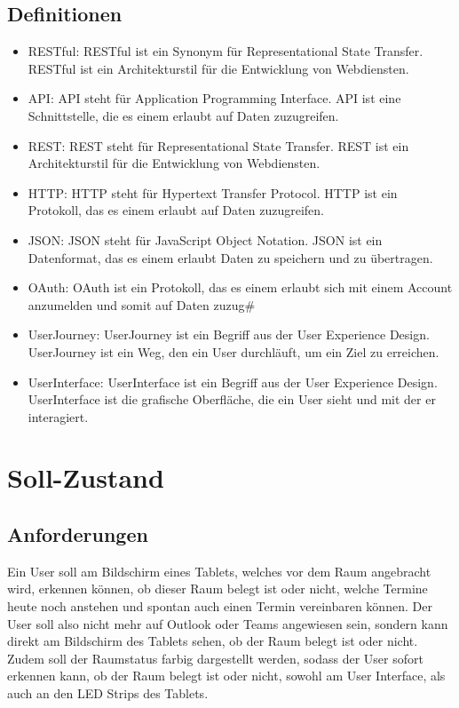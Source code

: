 \subsection{Definitionen}
\begin{itemize}
    \item \gls{RESTful}: RESTful ist ein Synonym für Representational State Transfer. RESTful ist ein Architekturstil für die Entwicklung von Webdiensten.
    \item \gls{API}: API steht für Application Programming Interface. API ist eine Schnittstelle, die es einem erlaubt auf Daten zuzugreifen.
    \item \gls{REST}: REST steht für Representational State Transfer. REST ist ein Architekturstil für die Entwicklung von Webdiensten.
    \item \gls{HTTP}: HTTP steht für Hypertext Transfer Protocol. HTTP ist ein Protokoll, das es einem erlaubt auf Daten zuzugreifen.
    \item \gls{JSON}: JSON steht für JavaScript Object Notation. JSON ist ein Datenformat, das es einem erlaubt Daten zu speichern und zu übertragen.
    \item \gls{OAuth}: OAuth ist ein Protokoll, das es einem erlaubt sich mit einem Account anzumelden und somit auf Daten zuzug#
    \item \gls{UserJourney}: \gls{UserJourney} ist ein Begriff aus der User Experience Design. \gls{UserJourney} ist ein Weg, den ein User durchläuft, um ein Ziel zu erreichen.
    \item \gls{UserInterface}: \gls{UserInterface} ist ein Begriff aus der User Experience Design. \gls{UserInterface} ist die grafische Oberfläche, die ein User sieht und mit der er interagiert.
\end{itemize}
\newpage
\section{Soll-Zustand}
\subsection{Anforderungen}
Ein User soll am Bildschirm eines Tablets, welches vor dem Raum angebracht wird, erkennen können, ob dieser Raum belegt ist oder nicht, welche Termine heute noch anstehen und spontan auch einen Termin vereinbaren können. Der User soll also nicht mehr auf Outlook oder Teams angewiesen sein, sondern kann direkt am Bildschirm des Tablets sehen, ob der Raum belegt ist oder nicht. Zudem soll der Raumstatus farbig dargestellt werden, sodass der User sofort erkennen kann, ob der Raum belegt ist oder nicht, sowohl am User Interface, als auch an den LED Strips des Tablets.
